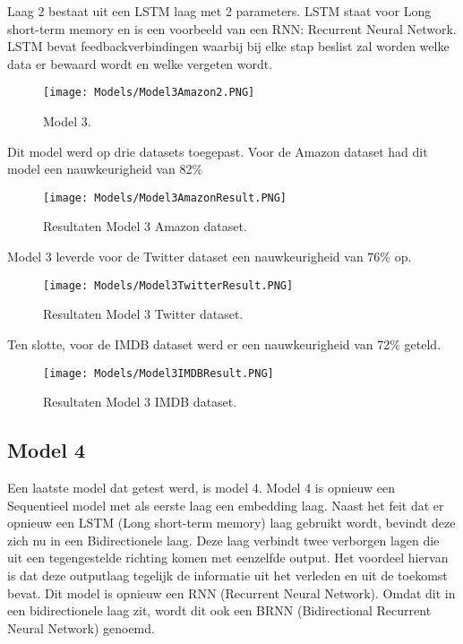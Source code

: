 Laag 2 bestaat uit een LSTM laag met 2 parameters. LSTM staat voor Long short-term memory en is een voorbeeld van een \gls{RNN}: Recurrent Neural Network. LSTM bevat feedbackverbindingen waarbij bij elke stap beslist zal worden welke data er bewaard wordt en welke vergeten wordt. 
\begin{figure}[!htbp]
    \texttt{[image: Models/Model3Amazon2.PNG]}
    \caption{\label{model3.2}Model 3.}
\end{figure}
\FloatBarrier

Dit model werd op drie datasets toegepast. Voor de Amazon dataset had dit model een nauwkeurigheid van 82\%

\begin{figure}[!htbp]
    \texttt{[image: Models/Model3AmazonResult.PNG]}
    \caption{\label{model3amazon}Resultaten Model 3 Amazon dataset.}
\end{figure}
\FloatBarrier

Model 3 leverde voor de Twitter dataset een nauwkeurigheid van 76\% op.

\begin{figure}[!htbp]
    \texttt{[image: Models/Model3TwitterResult.PNG]}
    \caption{\label{model3twitter}Resultaten Model 3 Twitter dataset.}
\end{figure}
\FloatBarrier

Ten slotte, voor de IMDB dataset werd er een nauwkeurigheid van 72\% geteld.

\begin{figure}[!htbp]
    \texttt{[image: Models/Model3IMDBResult.PNG]}
    \caption{\label{model3imdb}Resultaten Model 3 IMDB dataset.}
\end{figure}
\FloatBarrier

\subsection{Model 4}
Een laatste model dat getest werd, is model 4. Model 4 is opnieuw een Sequentieel model met als eerste laag een embedding laag. Naast het feit dat er opnieuw een LSTM (Long short-term memory) laag gebruikt wordt, bevindt deze zich nu in een Bidirectionele laag. Deze laag verbindt twee verborgen lagen die uit een tegengestelde richting komen met eenzelfde output. Het voordeel hiervan is dat deze outputlaag tegelijk de informatie uit het verleden en uit de toekomst bevat. Dit model is opnieuw een RNN (Recurrent Neural Network). Omdat dit in een bidirectionele laag zit, wordt dit ook een BRNN (Bidirectional Recurrent Neural Network) genoemd.

